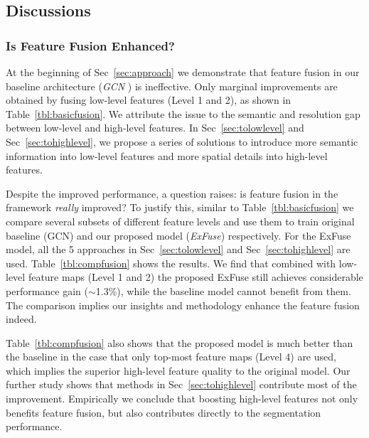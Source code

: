 \documentclass[runningheads]{llncs}
\begin{document}
\subsection{Discussions}

\subsubsection{Is Feature Fusion Enhanced?}
At the beginning of Sec~\ref{sec:approach} we demonstrate that feature fusion in our baseline architecture (\emph{GCN} \cite{Peng2017Large}) is ineffective. Only marginal improvements are obtained by fusing low-level features (Level 1 and 2), as shown in Table~\ref{tbl:basicfusion}. We attribute the issue to the semantic and resolution gap between low-level and high-level features. In Sec~\ref{sec:tolowlevel} and Sec~\ref{sec:tohighlevel}, we propose a series of solutions to introduce more semantic information into low-level features and more spatial details into high-level features. 

Despite the improved performance, a question raises: is feature fusion in the framework \emph{really} improved? To justify this, similar to Table~\ref{tbl:basicfusion} we compare several subsets of different feature levels and use them to train original baseline (GCN) and our proposed model (\emph{ExFuse}) respectively. For the ExFuse model, all the 5 approaches in Sec~\ref{sec:tolowlevel} and Sec~\ref{sec:tohighlevel} are used. Table~\ref{tbl:compfusion} shows the results. We find that combined with low-level feature maps (Level 1 and 2) the proposed ExFuse still achieves considerable performance gain ($\sim$1.3\%), while the baseline model cannot benefit from them. The comparison implies our insights and methodology enhance the feature fusion indeed.

Table~\ref{tbl:compfusion} also shows that the proposed model is much better than the baseline in the case that only top-most feature maps (Level 4) are used, which implies the superior high-level feature quality to the original model. Our further study shows that methods in Sec~\ref{sec:tohighlevel} contribute most of the improvement. Empirically we conclude that boosting high-level features not only benefits feature fusion, but also contributes directly to the segmentation performance.
\end{document}
